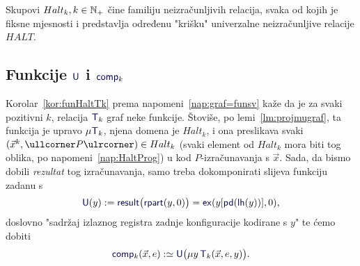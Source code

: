 Skupovi $Halt_k,k\in{\mathbb N}_+$ čine familiju neizračunljivih relacija, svaka od kojih je fiksne mjesnosti i predstavlja određenu "krišku" univerzalne neizračunljive relacije $HALT$.

\subsection{Funkcije \texorpdfstring{$\f U$ i $\f{comp}_k$}{U i comp}}

Korolar~\ref{kor:funHaltTk} prema napomeni~\ref{nap:graf=funsv} kaže da je za svaki pozitivni $k$, relacija $\f T_k$ graf neke funkcije. Štoviše, po lemi~\ref{lm:projmugraf}, ta funkcija je upravo $\mu\f T_k$, njena domena je $Halt_k$, i ona preslikava svaki $(\vec x^k,\kprog{P})\in Halt_k$ (svaki element od $Halt_k$ mora biti tog oblika, po napomeni~\ref{nap:HaltProg}) u kod $P$-izračunavanja s $\vec x$. Sada, da bismo dobili \emph{rezultat} tog izračunavanja, samo treba dokomponirati slijeva funkciju zadanu s
\begin{equation}\label{eq:Udef}
    \f U(y):=\f{result}\bigl(\f{rpart}(y,0)\bigr)=\f{ex}(y[\f{pd}(\f{lh}(y))],0)\text,
\end{equation}
doslovno "sadržaj izlaznog registra zadnje konfiguracije kodirane s $y$" te ćemo dobiti
\begin{equation}
    \f{comp}_k(\vec x,e):\simeq \f U\bigl(\mu y\,\f T_k(\vec x,e,y)\bigr)\text.
\end{equation}

